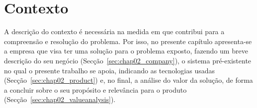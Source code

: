 \chapter{Contexto}
\label{chap:Chapter2}

A descrição do contexto é necessária na medida em que contribui para a compreensão e resolução do problema. Por isso, no presente capítulo apresenta-se a empresa que visa ter uma solução para o problema exposto, fazendo um breve descrição do seu negócio (Secção~\ref{sec:chap02_company}), o sistema pré-existente no qual o presente trabalho se apoia, indicando as tecnologias usadas (Secção~\ref{sec:chap02_product}) e, no final, a análise do valor da solução, de forma a concluir sobre o seu propósito e relevância para o produto (Secção~\ref{sec:chap02_valueanalysis}).  






